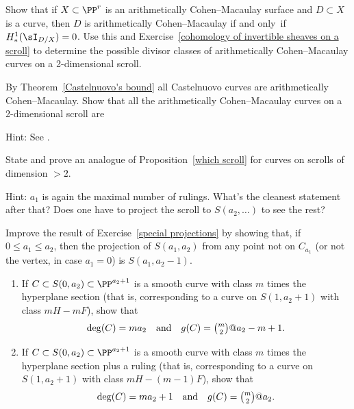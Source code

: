 \begin{exercise}
Show that if $X\subset\PP^r$ is an arithmetically Cohen--Macaulay surface
and $D\subset X$ is a curve, then $D$ is arithmetically Cohen--Macaulay
if and only~if
$H^1_*(\sI_{D/X}) = 0$. Use this and Exercise~\ref{cohomology of
invertible sheaves on a scroll} to determine the
possible divisor classes of arithmetically Cohen--Macaulay curves on a
2-dimensional scroll.
\end{exercise}

\begin{exercise}\label{Castelnuovo scrolls}
By Theorem~\ref{Castelnuovo's bound} all Castelnuovo curves are
arithmetically Cohen--Macaulay.
Show that all the arithmetically Cohen--Macaulay curves on a 2-dimensional
scroll are
%

Hint: See \cite[Section 3c]{MR685427}.
\end{exercise}

\begin{exercise}
State and prove an analogue of Proposition~\ref{which scroll} for curves
on scrolls of dimension $>2$.

Hint: $a_1$ is again the maximal number of rulings. What's the cleanest
statement after that? Does one have
to project the scroll to $S(a_2, \dots)$ to see the rest?
\end{exercise}

\begin{exercise}\label{general projections}
Improve the result of Exercise~\ref{special projections} by showing that,
if $0\leq a_1\leq a_2$, then
the projection of $S(a_1,a_2)$ from any point not on $C_{a_1}$ (or not
the vertex, in case $a_1=0$) is
$S(a_1, a_2-1)$.
\end{exercise}

\begin{exercise}\label{curves on cones}
\begin{enumerate}
\item If $C \subset S(0, a_2) \subset \PP^{a_2+1}$ is a smooth curve
with class $m$ times the hyperplane section (that is, corresponding to
a curve on $S(1,a_2+1)$ with class $mH - mF$), show that
$$
\deg(C) = ma_2 \quad \text{and} \quad g(C) = \tbinom{m}{2}@a_2 - m + 1.
$$
\item If $C \subset S(0, a_2) \subset \PP^{a_2+1}$ is a smooth curve
with class $m$ times the hyperplane section plus a ruling (that is,
corresponding to a curve on $S(1,a_2+1)$ with class $mH - (m-1)F$),
show that
$$
\deg(C) = ma_2 + 1 \quad \text{and} \quad g(C) = \tbinom{m}{2}@a_2.
$$
\end{enumerate}
\end{exercise}

